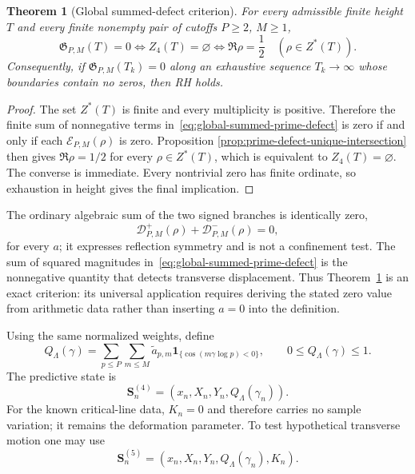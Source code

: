 \documentclass[11pt]{amsart}
\newtheorem{theorem}{Theorem}[section]
\theoremstyle{definition}
\theoremstyle{remark}
\begin{document}
\begin{theorem}[Global summed-defect criterion]
\label{thm:global-summed-prime-defect}
For every admissible finite height $T$ and every finite nonempty pair of cutoffs
$P\ge2$, $M\ge1$,
\begin{equation}\label{eq:global-summed-defect-equivalence}
 \boxed{\quad
 \mathfrak G_{P,M}(T)=0
 \iff Z_4(T)=\varnothing
 \iff \Re\rho=\frac12\quad(\rho\in Z^*(T)).\quad}
\end{equation}
Consequently, if $\mathfrak G_{P,M}(T_k)=0$ along an exhaustive sequence
$T_k\to\infty$ whose boundaries contain no zeros, then RH holds.
\end{theorem}
\begin{proof}
The set $Z^*(T)$ is finite and every multiplicity is positive.  Therefore the
finite sum of nonnegative terms in~\eqref{eq:global-summed-prime-defect} is zero
if and only if each $\mathcal E_{P,M}(\rho)$ is zero.  Proposition
\ref{prop:prime-defect-unique-intersection} then gives $\Re\rho=1/2$ for every
$\rho\in Z^*(T)$, which is equivalent to $Z_4(T)=\varnothing$.  The converse is
immediate.  Every nontrivial zero has finite ordinate, so exhaustion in height
gives the final implication.
\end{proof}

The ordinary algebraic sum of the two signed branches is identically zero,
\begin{equation}\label{eq:signed-branch-algebraic-cancellation}
 \mathcal D^{+}_{P,M}(\rho)+\mathcal D^{-}_{P,M}(\rho)=0,
\end{equation}
for every $a$; it expresses reflection symmetry and is not a confinement test.
The sum of squared magnitudes in~\eqref{eq:global-summed-prime-defect} is the
nonnegative quantity that detects transverse displacement.  Thus
Theorem~\ref{thm:global-summed-prime-defect} is an exact criterion: its universal
application requires deriving the stated zero value from arithmetic data rather
than inserting $a=0$ into the definition.

Using the same normalized weights, define
\begin{equation}\label{eq:Qlambda}
 Q_\Lambda(\gamma)
 =\sum_{p\le P}\sum_{m\le M}\widetilde a_{p,m}
 \mathbf 1_{\{\cos(m\gamma\log p)<0\}},
 \qquad 0\le Q_\Lambda(\gamma)\le1.
\end{equation}
The predictive state is
\begin{equation}\label{eq:state4d}
 \mathbf S_n^{(4)}=(x_n,X_n,Y_n,Q_\Lambda(\gamma_n)).
\end{equation}
For the known critical-line data, $K_n=0$ and therefore carries no sample variation; it remains
the deformation parameter.  To test hypothetical transverse motion one may use
\begin{equation}\label{eq:state5d}
 \mathbf S_n^{(5)}=(x_n,X_n,Y_n,Q_\Lambda(\gamma_n),K_n).
\end{equation}
\end{document}
